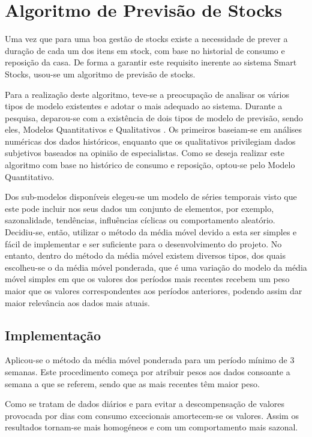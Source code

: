 \section{Algoritmo de Previsão de Stocks}\label{sec34}

Uma vez que para uma boa gestão de stocks existe a necessidade de prever a duração de cada um dos itens em stock, com base no historial de consumo e reposição da casa. De forma a garantir este requisito inerente ao sistema Smart Stocks, usou-se um algoritmo de previsão de stocks.

Para a realização deste algoritmo, teve-se a preocupação de analisar os vários tipos de modelo existentes e adotar o mais adequado ao sistema. Durante a pesquisa, deparou-se com a existência de dois tipos de modelo de previsão, sendo eles, Modelos Quantitativos e Qualitativos \cite{GestaoStocks:MetodosPrevisaoStocks}. Os primeiros baseiam-se em análises numéricas dos dados históricos, enquanto que os qualitativos privilegiam dados subjetivos baseados na opinião de especialistas. Como se deseja realizar este algoritmo com base no histórico de consumo e reposição, optou-se pelo Modelo Quantitativo. 

Dos sub-modelos disponíveis elegeu-se um modelo de séries temporais visto que este pode incluir nos seus dados um conjunto de elementos, por exemplo, sazonalidade, tendências, influências cíclicas ou comportamento aleatório. Decidiu-se, então, utilizar o método da média móvel devido a esta ser simples e fácil de implementar e ser suficiente para o desenvolvimento do projeto. No entanto, dentro do método da média móvel existem diversos tipos, dos quais escolheu-se o da média móvel ponderada, que é uma variação do modelo da média móvel simples em que os valores dos períodos mais recentes recebem um peso maior que os valores correspondentes aos períodos anteriores, podendo assim dar maior relevância aos dados mais atuais.

%
%
\subsection{Implementação}\label{subsec341}

Aplicou-se o método da média móvel ponderada para um período mínimo de 3 semanas. Este procedimento começa por atribuir pesos aos dados consoante a semana a que se referem, sendo que as mais recentes têm maior peso.

Como se tratam de dados diários e para evitar a descompensação de valores provocada por dias com consumo excecionais amortecem-se  os valores. Assim os resultados tornam-se mais homogéneos e com um comportamento mais sazonal.   

